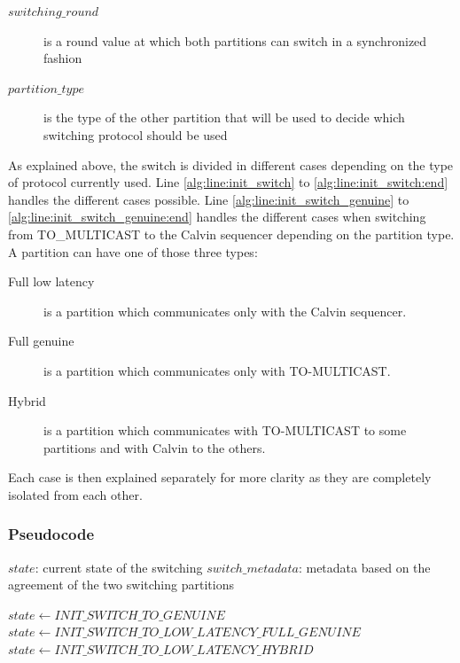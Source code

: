 \documentclass[a4paper, 10pt]{article}
\begin{document}
\begin{description}
   \item[$switching\_round$] is a round value at which both partitions can switch in a synchronized fashion
   \item[$partition\_type$] is the type of the other partition that will be used to decide which switching protocol should be used
\end{description}

As explained above, the switch is divided in different cases depending on the type of protocol currently used.
Line \ref{alg:line:init_switch} to \ref{alg:line:init_switch:end} handles the different cases possible.
Line \ref{alg:line:init_switch_genuine} to \ref{alg:line:init_switch_genuine:end} handles the different cases when
switching from TO\_MULTICAST to the Calvin sequencer depending on the partition type. A partition can have
one of those three types:

\begin{description}
    \item[Full low latency] is a partition which communicates only with the Calvin sequencer.
    \item[Full genuine] is a partition which communicates only with TO-MULTICAST.
    \item[Hybrid] is a partition which communicates with TO-MULTICAST to some partitions and
        with Calvin to the others.
\end{description}

Each case is then explained separately for more clarity as they are completely isolated from each other.

\subsubsection{Pseudocode}

\begin{algorithmic}[1]
    \Variables
        \State $state$: current state of the switching
        \State $switch\_metadata$: metadata based on the agreement of the two switching partitions
    \EndVariables

         \label{alg:line:init_switch}
            \State $state \gets INIT\_SWITCH\_TO\_GENUINE$
        \Else
             \label{alg:line:init_switch_genuine}
                \State $state \gets INIT\_SWITCH\_TO\_LOW\_LATENCY\_FULL\_GENUINE$
            \Else
                \State $state \gets INIT\_SWITCH\_TO\_LOW\_LATENCY\_HYBRID$
            \EndIf \label{alg:line:init_switch_genuine:end}
        \EndIf \label{alg:line:init_switch:end}
    \EndUpon
\end{algorithmic}
\end{document}

